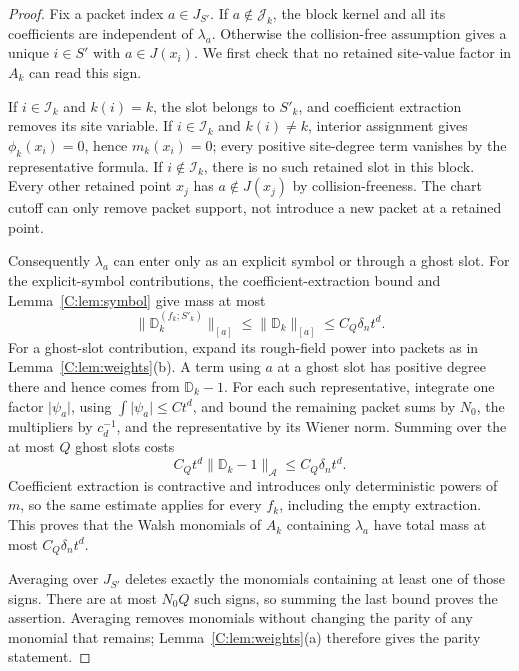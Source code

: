 \documentclass[11pt]{article}
\newcommand{\cA}{\mathcal{A}}
\newcommand{\cJ}{\mathcal{J}}
\newcommand{\norm}[1]{\lVert #1\rVert}
\newcommand{\abs}[1]{\lvert #1\rvert}
\begin{document}
\begin{proof}
Fix a packet index \(a\in J_{S'}\).  If \(a\notin\cJ_k\), the block
kernel and all its coefficients are independent of \(\lambda_a\).
Otherwise the collision-free assumption gives a unique
\(i\in S'\) with \(a\in J(x_i)\).  We first check that no retained
site-value factor in \(A_k\) can read this sign.

If \(i\in\mathcal I_k\) and \(k(i)=k\), the slot belongs to \(S'_k\),
and coefficient extraction removes its site variable.  If
\(i\in\mathcal I_k\) and \(k(i)\ne k\), interior assignment gives
\(\phi_k(x_i)=0\), hence \(m_k(x_i)=0\); every positive site-degree
term vanishes by the representative formula.  If
\(i\notin\mathcal I_k\), there is no such retained slot in this block.
Every other retained point \(x_j\) has \(a\notin J(x_j)\) by
collision-freeness.  The chart cutoff can only remove packet support,
not introduce a new packet at a retained point.

Consequently \(\lambda_a\) can enter only as an explicit symbol or
through a ghost slot.  For the explicit-symbol contributions, the
coefficient-extraction bound and Lemma~\ref{C:lem:symbol} give mass at
most
\[
 \norm{\mathbb D_k^{(f_k;S'_k)}}_{[a]}
 \le\norm{\mathbb D_k}_{[a]}
 \le C_Q\delta_nt^d.
\]
For a ghost-slot contribution, expand its rough-field power into
packets as in Lemma~\ref{C:lem:weights}(b).
A term using \(a\) at a ghost slot has positive degree there and hence
comes from \(\mathbb D_k-1\).  For each such representative, integrate
one factor \(\abs{\psi_a}\), using
\(\int\abs{\psi_a}\le Ct^d\), and bound the remaining packet sums by
\(N_0\), the multipliers by \(c_d^{-1}\), and the representative by
its Wiener norm.  Summing over the at most \(Q\) ghost slots costs
\[
 C_Qt^d\norm{\mathbb D_k-1}_\cA\le C_Q\delta_nt^d.
\]
Coefficient extraction is contractive and introduces only
deterministic powers of \(m\), so the same estimate applies for every
\(f_k\), including the empty extraction.  This proves that the
Walsh monomials of \(A_k\) containing \(\lambda_a\) have total mass
at most \(C_Q\delta_nt^d\).

Averaging over \(J_{S'}\) deletes exactly the monomials containing at
least one of those signs.  There are at most \(N_0Q\) such signs, so
summing the last bound proves the assertion.  Averaging removes
monomials without changing the parity of any monomial that remains;
Lemma~\ref{C:lem:weights}(a) therefore gives the parity statement.
\end{proof}
\end{document}
